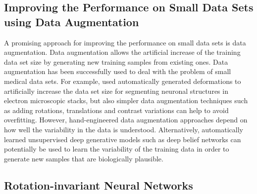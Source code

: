 \subsection[Improving the performance on small data sets using data
augmentation]{Improving the Performance on Small Data Sets using Data
Augmentation}

A promising approach for improving the performance on small data sets is data
augmentation. Data augmentation allows the artificial increase of the training
data set size by generating new training samples from existing ones. Data
augmentation has been successfully used to deal with the problem of small
medical data sets. For example, \citet{ronneberger2015} used automatically
generated deformations to artificially increase the data set size for segmenting
neuronal structures in electron microscopic stacks, but also simpler data
augmentation techniques such as adding rotations, translations and contrast
variations can help to avoid overfitting. However, hand-engineered data
augmentation approaches depend on how well the variability in the data is
understood. Alternatively, automatically learned unsupervised deep generative
models such as deep belief networks can potentially be used to learn the
variability of the training data in order to generate new samples that are
biologically plausible.

\subsection[Rotation-invariant neural networks]{Rotation-invariant Neural
Networks}


